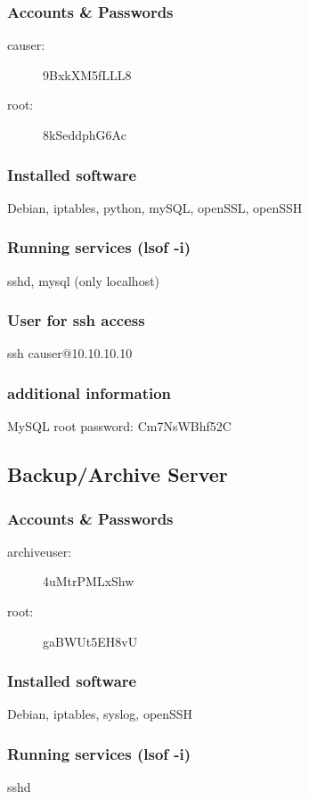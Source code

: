 \documentclass[a4paper,11pt]{article}
\begin{document}
\subsubsection*{Accounts \& Passwords}
\begin{multicols}{2}
\begin{description}
\item[causer:] 9BxkXM5fLLL8
\item[root:] 8kSeddphG6Ac
\end{description}
\end{multicols}
\subsubsection*{Installed software}
Debian, iptables, python, mySQL, openSSL, openSSH
\subsubsection*{Running services (lsof -i)}
sshd, mysql (only localhost)
\subsubsection*{User for ssh access}
ssh causer@10.10.10.10
\subsubsection*{additional information}
MySQL root password: Cm7NsWBhf52C

\subsection{Backup/Archive Server}
\subsubsection*{Accounts \& Passwords}
\begin{multicols}{2}
\begin{description}
\item[archiveuser:] 4uMtrPMLxShw
\item[root:] gaBWUt5EH8vU
\end{description}
\end{multicols}
\subsubsection*{Installed software}
Debian, iptables, syslog, openSSH
\subsubsection*{Running services (lsof -i)}
sshd
\end{document}

